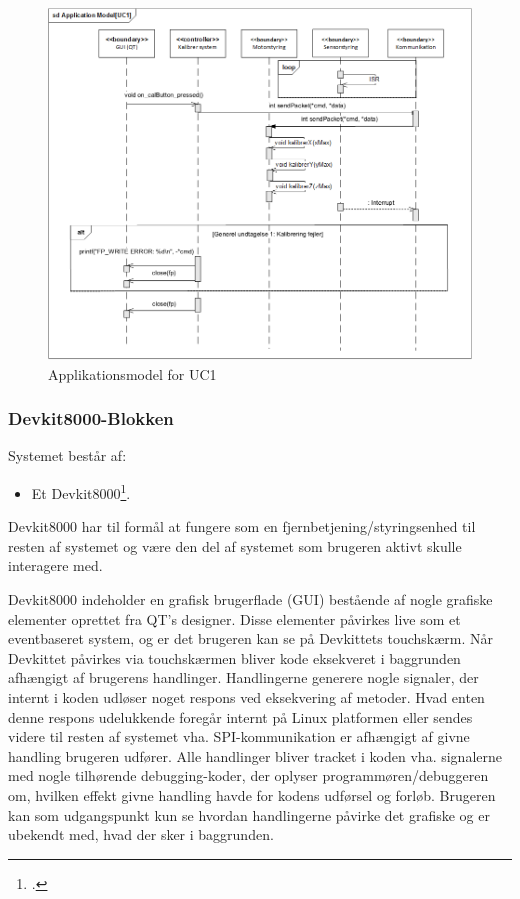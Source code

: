 \begin{figure}[H] \centering
    \includegraphics[width=\textwidth]{Filer/sdApplikationsmodelUC1.png}
    \caption{Applikationsmodel for UC1}
    \label{fig:sdUC1}
\end{figure}


\subsubsection{Devkit8000-Blokken}

Systemet består af:
\begin{itemize}
	\item Et Devkit8000\footcite{devkit}.
\end{itemize}

Devkit8000 har til formål at fungere som en fjernbetjening/styringsenhed til resten af systemet og være den del af systemet som brugeren aktivt skulle interagere med.

Devkit8000 indeholder en grafisk brugerflade (GUI) bestående af nogle grafiske elementer oprettet fra QT's designer. Disse elementer påvirkes live som et eventbaseret system, og er det brugeren kan se på Devkittets touchskærm. Når Devkittet påvirkes via touchskærmen bliver kode eksekveret i baggrunden afhængigt af brugerens handlinger. Handlingerne generere nogle signaler, der internt i koden udløser noget respons ved eksekvering af metoder. Hvad enten denne respons udelukkende foregår internt på Linux platformen eller sendes videre til resten af systemet vha. SPI-kommunikation er afhængigt af givne handling brugeren udfører. Alle handlinger bliver tracket i koden vha. signalerne med nogle tilhørende debugging-koder, der oplyser programmøren/debuggeren om, hvilken effekt givne handling havde for kodens udførsel og forløb. Brugeren kan som udgangspunkt kun se hvordan handlingerne påvirke det grafiske og er ubekendt med, hvad der sker i baggrunden.


